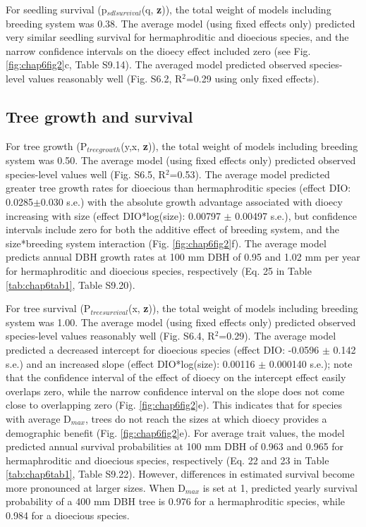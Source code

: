 \documentclass[b5paper,justified]{tufte-book} %
\begin{document}
\begin{fullwidth}
For seedling survival (p$_{sdl survival}$(q, \textbf{z})), the total weight of models including breeding system was 0.38. The average model (using fixed effects only) predicted very similar seedling survival for hermaphroditic and dioecious species, and the narrow confidence intervals on the dioecy effect included zero (see Fig. \ref{fig:chap6fig2}c, Table S9.14).  The averaged model predicted observed species-level values reasonably well (Fig. S6.2, R$^2$=0.29 using only fixed effects).

\subsection{Tree growth and survival}
For tree growth (P$_{tree growth}$(y,x, \textbf{z})), the total weight of models including breeding system was 0.50. The average model (using fixed effects only) predicted observed species-level values well (Fig. S6.5, R$^2$=0.53). The average model predicted greater tree growth rates for dioecious than hermaphroditic species (effect DIO: 0.0285$\pm$0.030 s.e.) with the absolute growth advantage associated with dioecy increasing with size (effect DIO*log(size): 0.00797 $\pm$ 0.00497 s.e.), but confidence intervals include zero for both the additive effect of breeding system, and the size*breeding system interaction (Fig. \ref{fig:chap6fig2}f). The average model predicts annual DBH growth rates at 100 mm DBH of 0.95 and 1.02 mm per year for hermaphroditic and dioecious species, respectively (Eq. 25 in Table \ref{tab:chap6tab1}, Table S9.20).

For tree survival (P$_{tree survival}$(x, \textbf{z})), the total weight of models including breeding system was 1.00. The average model (using fixed effects only) predicted observed species-level values reasonably well (Fig. S6.4, R$^2$=0.29). The average model predicted a decreased intercept for dioecious species (effect DIO: -0.0596 $\pm$ 0.142 s.e.) and an increased slope (effect DIO*log(size): 0.00116 $\pm$ 0.000140 s.e.); note that the confidence interval of the effect of dioecy on the intercept effect easily overlaps zero, while the narrow confidence interval on the slope does not come close to overlapping zero  (Fig. \ref{fig:chap6fig2}e). This indicates that for species with average D$_{max}$, trees do not reach the sizes at which dioecy provides a demographic benefit (Fig. \ref{fig:chap6fig2}e). For average trait values, the model predicted annual survival probabilities at 100 mm DBH of 0.963 and 0.965 for hermaphroditic and dioecious species, respectively (Eq. 22 and 23 in Table \ref{tab:chap6tab1}, Table S9.22). However, differences in estimated survival become more pronounced at larger sizes. When D$_{max}$ is set at 1, predicted yearly survival probability of a 400 mm DBH tree is 0.976 for a hermaphroditic species, while 0.984 for a dioecious species.


\end{fullwidth}
\end{document}
